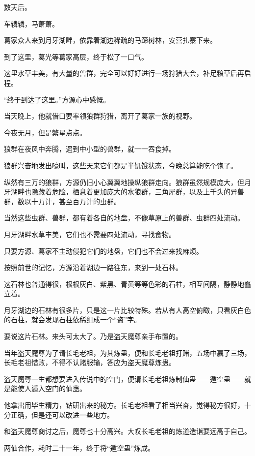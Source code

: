 
\begin{this_body}

数天后。

车辚辚，马萧萧。

葛家众人来到月牙湖畔，依靠着湖边稀疏的马蹄树林，安营扎寨下来。

到了这里，葛光等葛家高层，终于松了一口气。

这里水草丰美，有大量的兽群，完全可以好好进行一场狩猎大会，补足粮草后再启程。

“终于到达了这里。”方源心中感慨。

当天晚上，他就借口要率领狼群狩猎，离开了葛家一族的视野。

今夜无月，但是繁星点点。

狼群在夜风中奔腾，遇到中小型的兽群，就一一吞食掉。

狼群兴奋地发出嚎叫，这些天来它们都是半饥饿状态，今晚总算能吃个饱了。

纵然有三万的狼群，方源仍旧小心翼翼地操纵狼群走向。狼群虽然规模庞大，但月牙湖畔也隐藏着危险，栖息着更加庞大的水狼群，三角犀群，以及上千头的异兽群，数以十万计，甚至百万计的虫群。

当然这些虫群、兽群，都有着各自的地盘，不像草原上的兽群、虫群四处流动。

月牙湖畔水草丰美，它们也不需要四处流动，寻找食物。

只要方源、葛家不主动侵犯它们的地盘，它们也不会过来找麻烦。

按照前世的记忆，方源沿着湖边一路往东，来到一处石林。

这石林也普通得很，根根灰白、紫黑、青黄等等色彩的石柱，相互间隔，静静地矗立着。

月牙湖边的石林有很多片，只是这一片比较特殊。若从有人高空俯瞰，只看灰白色的石柱，就会发现石柱依稀组成一个“盗”字。

要说这片石林。来头可太大了。乃是盗天魔尊亲手布置的。

当年盗天魔尊为了请长毛老祖，为其炼蛊，便和长毛老祖打赌，五场中赢了三场，长毛老祖惜败，不得不认赌服输，答应为盗天魔尊炼蛊。

盗天魔尊一生都想要进入传说中的空门，便请长毛老祖炼制仙蛊——遁空蛊——就是能使人遁入空门的仙蛊。

他拿出用毕生精力，钻研出来的秘方。长毛老祖看了相当兴奋，觉得秘方很好，十分正确，但是还可以改进一些地方。

和盗天魔尊商讨之后，魔尊也十分高兴。大叹长毛老祖的炼道造诣要远高于自己。

两仙合作，耗时二十一年，终于将“遁空蛊”炼成。


\end{this_body}
